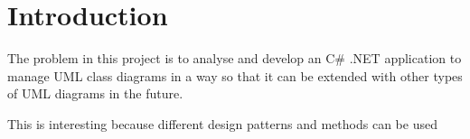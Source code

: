 \chapter{Introduction}
\label{sec:introduction}



The problem in this project is to analyse and develop an C\# .NET  application to manage UML class diagrams in a way so that it can be extended with other types of UML diagrams in the future.

This is interesting because different design patterns and methods can be used







